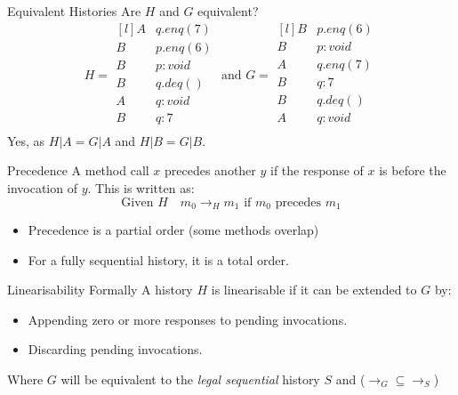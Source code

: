 \begin{examplebox}{Equivalent Histories}
    Are $H$ and $G$ equivalent?
    \[H = \begin{matrix*}[l]
        A & q.enq(7) \\
        B & p.enq(6) \\
        B & p : void \\
        B & q.deq() \\
        A & q: void \\
        B & q: 7 \\
    \end{matrix*} \text{ and } G = \begin{matrix*}[l]
        B & p.enq(6) \\
        B & p : void \\
        A & q.enq(7) \\
        B & q: 7 \\
        B & q.deq() \\
        A & q: void \\
    \end{matrix*}\]
    \tcblower
    Yes, as $H|A = G|A$ and $H|B = G|B$.
\end{examplebox}
\begin{definitionbox}{Precedence}
    A method call $x$ precedes another $y$ if the response of $x$ is before the invocation of $y$. This is written as:
    \[\text{Given } H \quad m_0 \to_H m_1 \text{ if }m_0 \text{ precedes }m_1\]
    \begin{itemize}
        \item Precedence is a partial order (some methods overlap)
        \item For a fully sequential history, it is a total order.
    \end{itemize}
\end{definitionbox}

\begin{definitionbox}{Linearisability Formally}
    A history $H$ is linearisable if it can be extended to $G$ by:
    \begin{itemize}
        \item Appending zero or more responses to pending invocations.
        \item Discarding pending invocations.
    \end{itemize}
    Where $G$ will be equivalent to the \textit{legal sequential} history $S$ and ($\to_G \subseteq \to_S$)
\end{definitionbox}


